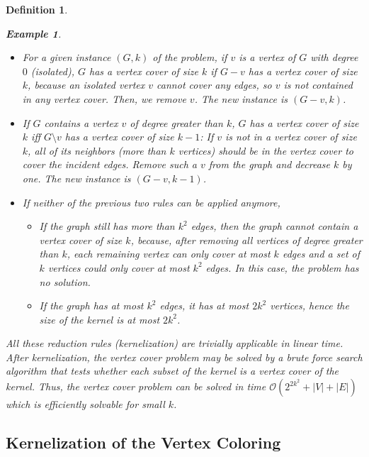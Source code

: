 \documentclass[12pt]{article}
\theoremstyle{slplain}
\newtheorem{defi}{Definition}[section]
\newtheorem{exam}{Example}[section]
\begin{document}
\begin{defi}
\begin{exam}
\begin{itemize}
\item For a given instance $(G,k)$ of the problem, if $v$ is a vertex of $G$ with degree $0$ (isolated), $G$ has a vertex cover of size $k$ if $G-v$ has a vertex cover of size $k$, because an isolated vertex $v$ cannot cover any edges, so $v$ is not contained in any vertex cover. Then, we remove $v$. The new instance is $(G - v , k)$.


\item If $G$ contains a vertex $v$ of degree greater than $k$, $G$ has a vertex cover of size $k$ iff $G\setminus v$ has a vertex cover of size $k - 1$: If $v$ is not in a vertex cover of size $k$, all of its neighbors (more than $k$ vertices) should be in the vertex cover to cover the incident edges. Remove such a $v$ from the graph and decrease $k$ by one. The new instance is $(G - v , k - 1)$.

\item If neither of the previous two rules can be applied anymore,
\begin{itemize}
\item If the graph still has more than $k^2$ edges, then the graph cannot contain a vertex cover of size $k$, because, after  removing all vertices of degree greater than 
$k$, each remaining vertex can only cover at most $k$ edges and a set of
$k$ vertices could only cover at most $k^2$ edges. In this case, the problem has no solution.

\item If the graph has at most $k^2$ edges, it has at most $2 k^2$ vertices, hence the size of the kernel is at most $2 k^2$.
\end{itemize}

  
\end{itemize}



All these reduction rules (kernelization) are trivially applicable in linear time. After kernelization, the vertex cover problem may be solved by a brute force search algorithm that tests whether each subset of the kernel is a vertex cover of the kernel. Thus, the vertex cover problem can be solved in time $\mathcal{O}(2^{2k^2} + |V| + |E|)$ which is efficiently solvable for small $k$.
\end{exam}

\newpage
\subsection{Kernelization of the Vertex Coloring}


\end{defi}
\end{document}
